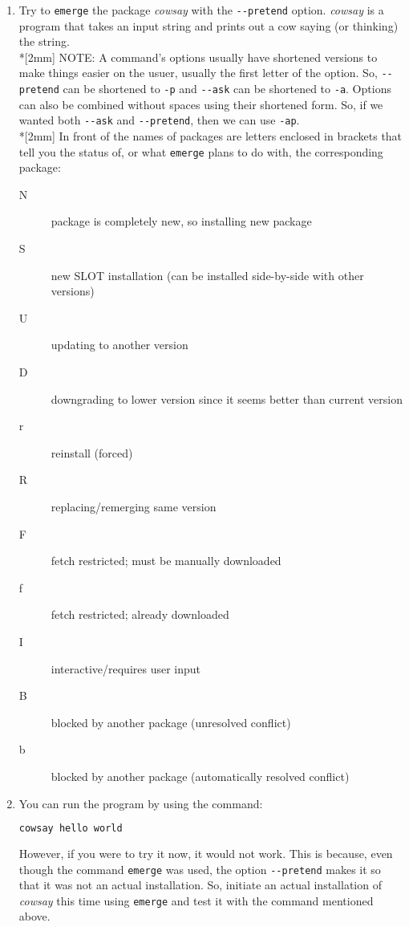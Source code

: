 \documentclass[11pt]{article}
\begin{document}
\begin{enumerate}
     \item Try to \verb|emerge| the package \textit{cowsay} with the \verb|--pretend| option. \textit{cowsay} is a program that takes an input string and prints out a cow saying (or thinking) the string.
     \\*[2mm] NOTE: A command's options usually have shortened versions to make things easier on the usuer, usually the first letter of the option. So, \verb|--pretend| can be shortened to \verb|-p| and \verb|--ask| can be shortened to \verb|-a|. Options can also be combined without spaces using their shortened form. So, if we wanted both \verb|--ask| and \verb|--pretend|, then we can use \verb|-ap|. 
     \\*[2mm] In front of the names of packages are letters enclosed in brackets that tell you the status of, or what \verb|emerge| plans to do with, the corresponding package:
     \begin{description}
       \item[N] package is completely new, so installing new package
       \item[S] new SLOT installation (can be installed side-by-side with other versions)
       \item[U] updating to another version
       \item[D] downgrading to lower version since it seems better than current version
       \item[r] reinstall (forced)
       \item[R] replacing/remerging same version
       \item[F] fetch restricted; must be manually downloaded
       \item[f] fetch restricted; already downloaded
       \item[I] interactive/requires user input
       \item[B] blocked by another package (unresolved conflict)
       \item[b] blocked by another package (automatically resolved conflict)
     \end{description}
     \item You can run the program by using the command:
     \begin{lstlisting}[basicstyle=\ttfamily, backgroundcolor = \color{lightgray}, language = bash, xleftmargin = 0cm, framexleftmargin = 1em, showstringspaces=false]
cowsay hello world
\end{lstlisting}
     However, if you were to try it now, it would not work. This is because, even though the command \verb|emerge| was used, the option \verb|--pretend| makes it so that it was not an actual installation. So, initiate an actual installation of \textit{cowsay} this time using \verb|emerge| and test it with the command mentioned above.
   \end{enumerate}
  
\end{document}
